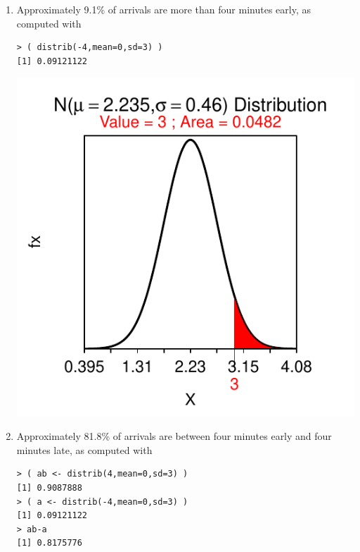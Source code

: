 \documentclass[10pt,openany]{book}\usepackage[]{graphicx}\usepackage[]{color}
\makeatletter
\newenvironment{kframe}{%
 \def\at@end@of@kframe{}%
 \ifinner\ifhmode%
  \def\at@end@of@kframe{\end{minipage}}%
  \begin{minipage}{\columnwidth}%
 \fi\fi%
 \def\FrameCommand##1{\hskip\@totalleftmargin \hskip-\fboxsep
 \colorbox{shadecolor}{##1}\hskip-\fboxsep
     \hskip-\linewidth \hskip-\@totalleftmargin \hskip\columnwidth}%
 \MakeFramed {\advance\hsize-\width
   \@totalleftmargin\z@ \linewidth\hsize
   \@setminipage}}%
 {\par\unskip\endMakeFramed%
 \at@end@of@kframe}
\newenvironment{knitrout}{}{} %
\makeatother
\begin{document}
\begin{itemize}
\begin{enumerate}
\begin{knitrout}
{}



\end{knitrout}
      \item Approximately 9.1\% of arrivals are more than four minutes early, as computed with
\begin{knitrout}
\color{fgcolor}\begin{kframe}
\begin{verbatim}
> ( distrib(-4,mean=0,sd=3) )
[1] 0.09121122
\end{verbatim}
\end{kframe}

{\centering \includegraphics[width=.4\linewidth]{Figs/unnamed-chunk-238-1} 

}



\end{knitrout}
      \item Approximately 81.8\% of arrivals are between four minutes early and four minutes late, as computed with
\begin{knitrout}
\color{fgcolor}\begin{kframe}
\begin{verbatim}
> ( ab <- distrib(4,mean=0,sd=3) )
[1] 0.9087888
> ( a <- distrib(-4,mean=0,sd=3) )
[1] 0.09121122
> ab-a
[1] 0.8175776
\end{verbatim}
\end{kframe}


\end{knitrout}
\end{enumerate}
\end{itemize}
\end{document}
